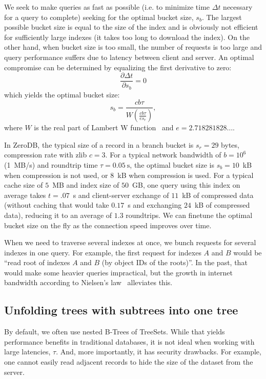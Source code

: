 \documentclass[notitlepage,longbibliography]{revtex4-1}
\begin{document}
We seek to make queries as fast as possible (i.e. to minimize time $\Delta t$ necessary for a query to complete) seeking for the optimal bucket size, $s_b$.
The largest possible bucket size is equal to the size of the index and is obviously not efficient for sufficiently large indexes (it takes too long to download the index).
On the other hand, when bucket size is too small, the number of requests is too large and query performance suffers due to latency between client and server.
An optimal compromise can be determined by equalizing the first derivative to zero:
$$\frac{\partial \Delta t}{\partial s_b} = 0$$
which yields the optimal bucket size:
$$s_b = \frac{cb\tau}{W\left( \frac{cb\tau}{e s_r}\right)},$$
where $W$ is the real part of Lambert W function~\cite{wiki:lambert}
and $e=2.718281828\ldots$.

In ZeroDB, the typical size of a record in a branch bucket is $s_r = 29$ bytes,
compression rate with zlib $c=3$.
For a typical network bandwidth of $b=10^6$ (1~MB/s) and roundtrip time $\tau=0.05~\mbox{s}$, the optimal bucket size is $s_b=10$~kB when compression is not used, or $8$~kB when compression is used.
For a typical cache size of $5$~MB and index size of $50$~GB,
one query using this index on average takes $t=.07$~s and client-server exchange of $11$~kB of compressed data (without caching that would take $0.17$~s and exchanging $24$~kB of compressed data), reducing it to an average of $1.3$ roundtrips.
We can finetune the optimal bucket size on the fly as the connection speed improves over time.

When we need to traverse several indexes at once, we bunch requests for several indexes in one query.
For example, the first request for indexes $A$ and $B$ would be ``read root of indexes $A$ and $B$ (by object IDs of the roots)''.
In the past, that would make some heavier queries impractical, but the growth in internet bandwidth according to Nielsen's law~\cite{nielsen-law} alleviates this.

\subsection{Unfolding trees with subtrees into one tree}
\label{sec:unfold-trees}

By default, we often use nested B-Trees of TreeSets.
While that yields performance benefits in traditional databases, it is not ideal when working with large latencies, $\tau$.
And, more importantly, it has security drawbacks.
For example, one cannot easily read adjacent records to hide the size of the dataset from the server.
\end{document}
